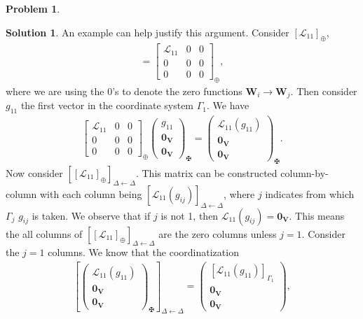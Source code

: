 \documentclass{article}
\theoremstyle{definition}
\newtheorem*{prob*}{Problem}
\newtheorem*{sln*}{Solution}
\newcommand{\V}{\mathbf{V}}
\newcommand{\W}{\mathbf{W}}
\newcommand{\lag}{\mathcal{L}}
\begin{document}
\begin{prob*}
\begin{sln*}
	An example can help justify this argument. Consider $[\lag_{11}]_\oplus$,
	\begin{align*}
	[\lag_{11}] = \begin{bmatrix}
	\lag_{11} & 0 & 0\\
	0 & 0 & 0\\
	0 & 0 & 0
	\end{bmatrix}_\oplus,
	\end{align*}
	where we are using the $0$'s to denote the zero functions $\W_i \to \W_j$. Then consider $g_{11}$ the first vector in the coordinate system $\Gamma_1$. We have
	\begin{align*}
	\begin{bmatrix}
	\lag_{11} & 0 & 0\\
	0 & 0 & 0\\
	0 & 0 & 0
	\end{bmatrix}_\oplus\begin{pmatrix}
	g_{11} \\ \mathbf{0}_\V \\ \mathbf{0}_\V
	\end{pmatrix}_\maltese = \begin{pmatrix}
	\lag_{11}(g_{11}) \\ \mathbf{0}_\V \\ \mathbf{0}_\V
	\end{pmatrix}_\maltese.
	\end{align*}
	Now consider $\left[[\lag_{11}]_\oplus\right]_{\Delta\leftarrow\Delta}$. This matrix can be constructed column-by-column with each column being $[\lag_{11}(g_{ij})]_{\Delta\leftarrow\Delta}$, where $j$ indicates from which $\Gamma_j$ $g_{ij}$ is taken. We observe that if $j$ is not 1, then $\lag_{11}(g_{ij}) = \mathbf{0}_\V$. This means the all columns of $\left[[\lag_{11}]_\oplus\right]_{\Delta\leftarrow\Delta}$ are the zero columns unless $j=1$. Consider the $j=1$ columns. We know that the coordinatization
	\begin{align*}
	\left[\begin{pmatrix}
	\lag_{11}(g_{11}) \\ \mathbf{0}_\V \\ \mathbf{0}_\V
	\end{pmatrix}_\maltese\right]_{\Delta\leftarrow\Delta}
	=
	\begin{pmatrix}
	[\lag_{11}(g_{11})]_{\Gamma_1} \\ \mathbf{0}_\V \\ \mathbf{0}_\V
	\end{pmatrix},
	\end{align*}

\end{sln*}
\end{prob*}
\end{document}
